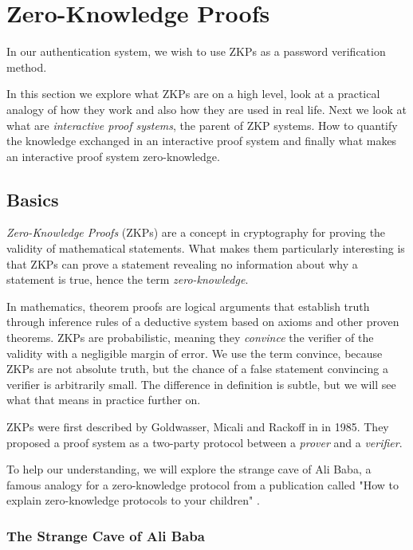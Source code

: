 \section{Zero-Knowledge Proofs}
In our authentication system, we wish to use ZKPs as a password verification method.

In this section we explore what ZKPs are on a high level, look at a practical analogy of how they work and also how they are used in real life.
Next we look at what are \textit{interactive proof systems}, the parent of ZKP systems. How to quantify the knowledge exchanged in an interactive proof system and finally what makes an interactive proof system zero-knowledge.

\subsection{Basics}
\textit{Zero-Knowledge Proofs} (ZKPs) are a concept in cryptography for proving the validity of mathematical statements.
What makes them particularly interesting is that ZKPs can prove a statement revealing no information about why a statement is true, hence the term \textit{zero-knowledge}.

In mathematics, theorem proofs are logical arguments that establish truth through inference rules of a deductive system based on axioms and other proven theorems.
ZKPs are probabilistic, meaning they \textit{convince} the verifier of the validity with a negligible margin of error.
We use the term convince, because ZKPs are not absolute truth, but the chance of a false statement convincing a verifier is arbitrarily small. 
The difference in definition is subtle, but we will see what that means in practice further on.

ZKPs were first described by Goldwasser, Micali and Rackoff in \cite{goldwasser1989knowledge} in 1985. 
They proposed a proof system as a two-party protocol between a \textit{prover} and a \textit{verifier}.

To help our understanding, we will explore the strange cave of Ali Baba, a famous analogy for a zero-knowledge protocol from a publication called "How to explain zero-knowledge protocols to your children" \cite{10.1007/0-387-34805-0_60}.

\newpage
\subsubsection{The Strange Cave of Ali Baba}

\bigskip

